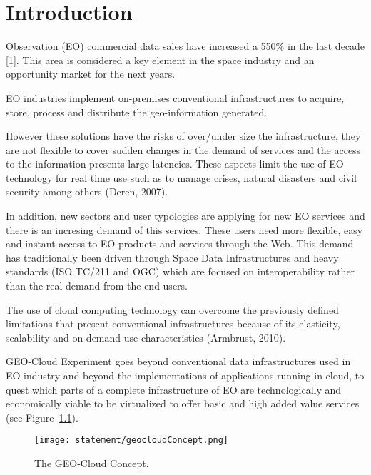 \chapter{Introduction}

 Observation (\acs{EO}) commercial data sales have increased a 550\% in
the last decade \cite{sousa}[1]. This area is considered a key element in the
space industry and an opportunity market for the next years.

\ac{EO} industries implement on-premises conventional infrastructures to acquire,
store, process and distribute the geo-information generated.

However these solutions have the risks of over/under size the infrastructure, they are not flexible to cover sudden changes in the demand of services and the access to the information presents large latencies.  These aspects limit the use of \ac{EO} technology for real time use such as to manage crises, natural disasters and civil security among others (Deren, 2007).

In addition, new sectors and user typologies are applying for new \ac{EO} services
and there is an incresing demand of this services. These users
need more flexible, easy and instant access to \ac{EO} products and services through
the Web. This demand has traditionally been driven through Space Data
Infrastructures and heavy standards (\acs{ISO} TC/211 and \ac{OGC}) which are focused on
interoperability rather than the real demand from the end-users.

The use of cloud computing technology can overcome the previously defined limitations that present conventional infrastructures because of its elasticity, scalability and on-demand use characteristics (Armbrust, 2010).

GEO-Cloud Experiment goes beyond conventional data infrastructures used in \ac{EO}
industry and beyond the implementations of applications running in cloud, to
quest which parts of a complete infrastructure of \ac{EO} are technologically and
economically viable to be virtualized to offer basic and high added value
services (see Figure~\ref{fig:intr-geocloudConcept}).

\begin{figure}[!h]
\begin{center}
\texttt{[image: statement/geocloudConcept.png]}
\caption{The GEO-Cloud Concept.}
\label{fig:intr-geocloudConcept}
\end{center}
\end{figure}

